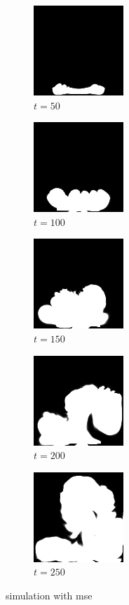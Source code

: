 \documentclass[a4paper,12pt,twoside]{report}
\begin{document}
\begin{figure}
\centering
\begin{subfigure}{0.18\textwidth}
  \centering
  \includegraphics[scale=0.56]{buoyancy_test/dens_000050_mse.png}
  \caption{$t=50$}
\end{subfigure}
\begin{subfigure}{0.18\textwidth}
  \centering
  \includegraphics[scale=0.56]{buoyancy_test/dens_000100_mse.png}
  \caption{$t=100$}
\end{subfigure}
\begin{subfigure}{0.18\textwidth}
  \centering
  \includegraphics[scale=0.56]{buoyancy_test/dens_000150_mse.png}
  \caption{$t=150$}
\end{subfigure}
\begin{subfigure}{0.18\textwidth}
  \centering
  \includegraphics[scale=0.56]{buoyancy_test/dens_000200_mse.png}
  \caption{$t=200$}
\end{subfigure}
\begin{subfigure}{0.18\textwidth}
  \centering
  \includegraphics[scale=0.56]{buoyancy_test/dens_000249_mse.png}
  \caption{$t=250$}
\end{subfigure}
\caption{simulation with mse}
\label{sol buoyancy high mse}
\end{figure}
\end{document}
